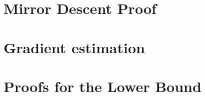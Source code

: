 
\section{Mirror Descent Proof}
\label{sec:appendix-md}


\section{Gradient estimation}
\label{sec:appendix-grad}


\section{Proofs for the Lower Bound}
\label{sec:appendix-lb-proof}



